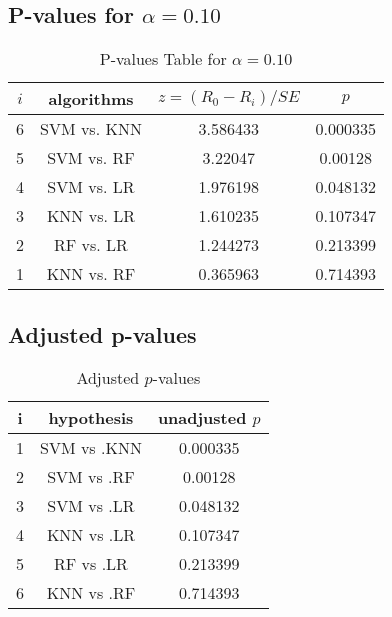 \documentclass[a4paper,10pt]{article}
\begin{document}
\begin{landscape}
\subsection{P-values for $\alpha=0.10$}

\begin{table}[!htp]
\centering\scriptsize
\begin{tabular}{cccc}
$i$&algorithms&$z=(R_0 - R_i)/SE$&$p$\\
\hline6&SVM vs. KNN&3.586433&0.000335\\
5&SVM vs. RF&3.22047&0.00128\\
4&SVM vs. LR&1.976198&0.048132\\
3&KNN vs. LR&1.610235&0.107347\\
2&RF vs. LR&1.244273&0.213399\\
1&KNN vs. RF&0.365963&0.714393\\
\hline
\end{tabular}
\caption{P-values Table for $\alpha=0.10$}
\end{table}\pagebreak

\subsection{Adjusted p-values}

\begin{table}[!htp]
\centering\scriptsize
\begin{tabular}{ccc}
i&hypothesis&unadjusted $p$\\
\hline1&SVM vs .KNN&0.000335\\
2&SVM vs .RF&0.00128\\
3&SVM vs .LR&0.048132\\
4&KNN vs .LR&0.107347\\
5&RF vs .LR&0.213399\\
6&KNN vs .RF&0.714393\\
\hline
\end{tabular}
\caption{Adjusted $p$-values}
\end{table}

\end{landscape}
\end{document}

